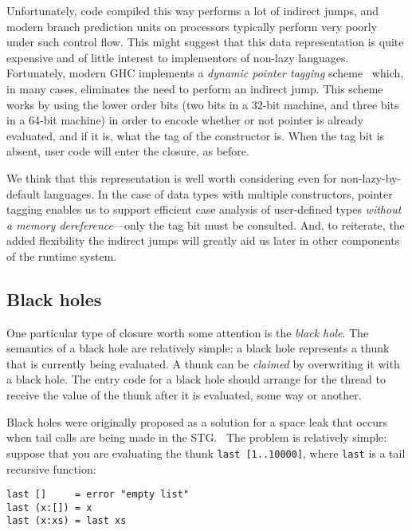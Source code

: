 Unfortunately, code compiled this way performs a lot of indirect jumps,
and modern branch prediction units on processors typically perform very
poorly under such control flow.  This might suggest that this data
representation is quite expensive and of little interest to implementors
of non-lazy languages.  Fortunately, modern GHC implements a
\emph{dynamic pointer tagging} scheme~\XXX{} which, in many cases,
eliminates the need to perform an indirect jump.  This scheme works by
using the lower order bits (two bits in a 32-bit machine, and three bits
in a 64-bit machine) in order to encode whether or not pointer is
already evaluated, and if it is, what the tag of the constructor is.
When the tag bit is absent, user code will enter the closure, as before.

We think that this representation is well worth considering even for
non-lazy-by-default languages.  In the case of data types with multiple
constructors, pointer tagging enables us to support efficient case
analysis of user-defined types \emph{without a memory
dereference}---only the tag bit must be consulted.  And, to reiterate,
the added flexibility the indirect jumps will greatly aid us later in
other components of the runtime system.


\subsection{Black holes} \label{sec:blackhole}

One particular type of closure worth some attention is the \emph{black
hole}.  The semantics of a black hole are relatively simple: a black
hole represents a thunk that is currently being evaluated.  A thunk
can be \emph{claimed} by overwriting it with a black hole. The entry
code for a black hole should arrange for the thread to receive the value
of the thunk after it is evaluated, some way or another.

Black holes were originally proposed as a solution for a space leak that
occurs when tail calls are being made in the STG.~\cite{Jones2008} The
problem is relatively simple: suppose that you are evaluating the thunk \verb|last [1..10000]|,
where \verb|last| is a tail recursive function:

\begin{verbatim}
last []     = error "empty list"
last (x:[]) = x
last (x:xs) = last xs
\end{verbatim}


